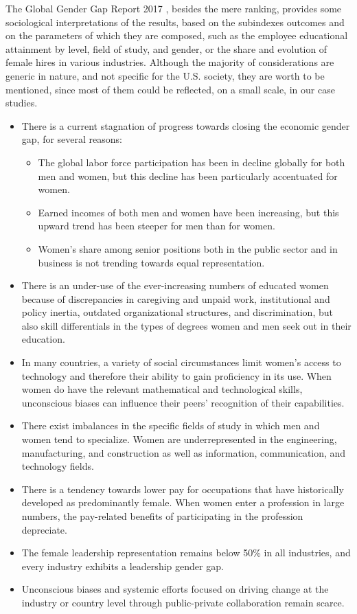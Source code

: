 The Global Gender Gap Report 2017 \cite{schwab2017global}, besides the mere ranking, provides some sociological interpretations of the results, based on the subindexes outcomes and on the parameters of which they are composed, such as the employee educational attainment by level, field of study, and gender, or the share and evolution of female hires in various industries. Although the majority of considerations are generic in nature, and not specific for the U.S. society, they are worth to be mentioned, since most of them could be reflected, on a small scale, in our case studies.
\begin{itemize}
\item There is a current stagnation of progress towards closing the economic gender gap, for several reasons:
\begin{itemize}
\item The global labor force participation has been in decline globally for both men and women, but this decline has been particularly accentuated for women.
\item Earned incomes of both men and women have been increasing, but this upward trend has been steeper for men than for women.
\item Women's share among senior positions both in the public sector and in business is not trending towards equal representation.
\end{itemize}
\item There is an under-use of the ever-increasing numbers of educated women because of discrepancies in caregiving and unpaid work, institutional and policy inertia, outdated organizational structures, and discrimination, but also skill differentials in the types of degrees women and men seek out in their education.
\item In many countries, a variety of social circumstances limit women's access to technology and therefore their ability to gain proficiency in its use. When women do have the relevant mathematical and technological skills, unconscious biases can influence their peers' recognition of their capabilities.
\item There exist imbalances in the specific fields of study in which men and women tend to specialize. Women are underrepresented in the engineering, manufacturing, and construction as well as information, communication, and technology fields.
\item There is a tendency towards lower pay for occupations that have historically developed as predominantly female. When women enter a profession in large numbers, the pay-related benefits of participating in the profession depreciate.
\item The female leadership representation remains below 50\% in all industries, and every industry exhibits a leadership gender gap.
\item Unconscious biases and systemic efforts focused on driving change at the industry or country level through public-private collaboration remain scarce.
\end{itemize}


